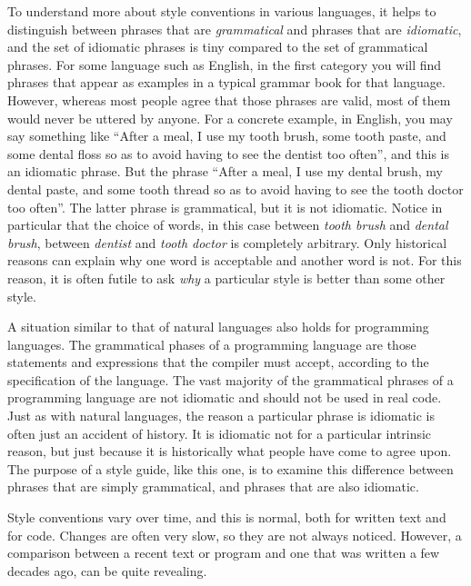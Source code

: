 To understand more about style conventions in various languages, it
helps to distinguish between phrases that are \emph{grammatical} and
phrases that are \emph{idiomatic}, and the set of idiomatic phrases is
tiny compared to the set of grammatical phrases.  For some language
such as English, in the first category you will find phrases that
appear as examples in a typical grammar book for that language.
However, whereas most people agree that those phrases are valid, most
of them would never be uttered by anyone.  For a concrete example, in
English, you may say something like ``After a meal, I use my tooth
brush, some tooth paste, and some dental floss so as to avoid having
to see the dentist too often'', and this is an idiomatic phrase.  But
the phrase ``After a meal, I use my dental brush, my dental paste, and
some tooth thread so as to avoid having to see the tooth doctor too
often''.  The latter phrase is grammatical, but it is not idiomatic.
Notice in particular that the choice of words, in this case between
\emph{tooth brush} and \emph{dental brush}, between \emph{dentist} and
\emph{tooth doctor} is completely arbitrary.  Only historical reasons
can explain why one word is acceptable and another word is not.  For
this reason, it is often futile to ask \emph{why} a particular style
is better than some other style.

A situation similar to that of natural languages also holds for
programming languages.  The grammatical phases of a programming
language are those statements and expressions that the compiler must
accept, according to the specification of the language.  The vast
majority of the grammatical phrases of a programming language are not
idiomatic and should not be used in real code.  Just as with natural
languages, the reason a particular phrase is idiomatic is often just
an accident of history.  It is idiomatic not for a particular
intrinsic reason, but just because it is historically what people have
come to agree upon.  The purpose of a style guide, like this one, is
to examine this difference between phrases that are simply
grammatical, and phrases that are also idiomatic.

Style conventions vary over time, and this is normal, both for written
text and for code.  Changes are often very slow, so they are not
always noticed.  However, a comparison between a recent text or
program and one that was written a few decades ago, can be quite
revealing.

